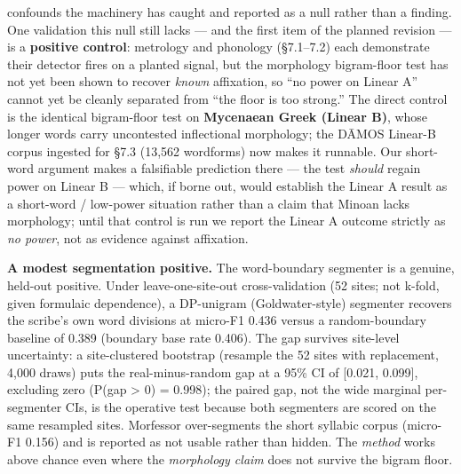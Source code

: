 \documentclass[
  10pt,
]{article}
\begin{document}
confounds the machinery has caught and reported as a null rather than a
finding. One validation this null still lacks --- and the first item of
the planned revision --- is a \textbf{positive control}: metrology and
phonology (§7.1--7.2) each demonstrate their detector fires on a planted
signal, but the morphology bigram-floor test has not yet been shown to
recover \emph{known} affixation, so ``no power on Linear A'' cannot yet
be cleanly separated from ``the floor is too strong.'' The direct
control is the identical bigram-floor test on \textbf{Mycenaean Greek
(Linear B)}, whose longer words carry uncontested inflectional
morphology; the DĀMOS Linear-B corpus ingested for §7.3 (13,562
wordforms) now makes it runnable. Our short-word argument makes a
falsifiable prediction there --- the test \emph{should} regain power on
Linear B --- which, if borne out, would establish the Linear A result as
a short-word / low-power situation rather than a claim that Minoan lacks
morphology; until that control is run we report the Linear A outcome
strictly as \emph{no power}, not as evidence against affixation.

\textbf{A modest segmentation positive.} The word-boundary segmenter is
a genuine, held-out positive. Under leave-one-site-out cross-validation
(52 sites; not k-fold, given formulaic dependence), a DP-unigram
(Goldwater-style) segmenter recovers the scribe's own word divisions at
micro-F1 0.436 versus a random-boundary baseline of 0.389 (boundary base
rate 0.406). The gap survives site-level uncertainty: a site-clustered
bootstrap (resample the 52 sites with replacement, 4,000 draws) puts the
real-minus-random gap at a 95\% CI of {[}0.021, 0.099{]}, excluding zero
(P(gap \textgreater{} 0) = 0.998); the paired gap, not the wide marginal
per-segmenter CIs, is the operative test because both segmenters are
scored on the same resampled sites. Morfessor over-segments the short
syllabic corpus (micro-F1 0.156) and is reported as not usable rather
than hidden. The \emph{method} works above chance even where the
\emph{morphology claim} does not survive the bigram floor.
\end{document}
